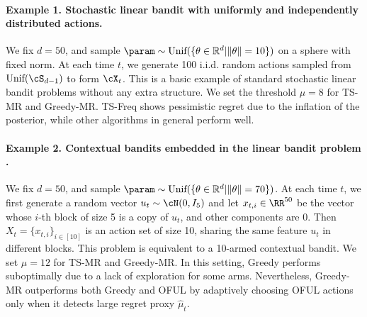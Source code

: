 \paragraph{Example 1. Stochastic linear bandit with uniformly and independently distributed actions.} We fix $d = 50$, and sample $\param\sim\text{Unif}(\{\theta \in \mathbb{R}^d|\|\theta\|= 10\}) $ on a sphere with fixed norm. At each time $t$, we generate 100 i.i.d. random actions sampled from $\text{Unif}(\cS_{d-1})$ to form $\cX_t$. This is a basic example of standard stochastic linear bandit problems without any extra structure. We set the threshold  $\mu = 8$ for TS-MR and Greedy-MR. TS-Freq shows pessimistic regret due to the inflation of the posterior, while other algorithms in general perform well. 



\paragraph{Example 2. Contextual bandits embedded in the linear bandit problem  \citep{abbasi2013online}.} We fix $d = 50$, and sample $\param\sim\text{Unif}(\{\theta \in \mathbb{R}^d|\|\theta\|= 70\}) $. At each time $t$, we first  generate a random vector $u_t \sim \cN(0, I_5)$ and let $x_{t,i}\in \RR^{50}$ be the vector whose $i$-th block of size 5 is a  copy of $u_t$, and other components are 0. Then $X_t = \{x_{t,i}\}_{i\in [10] }$ is an action set of size 10, sharing the same feature $u_t$ in different blocks. This problem is equivalent to a 10-armed contextual bandit. We set $\mu = 12$ for TS-MR and Greedy-MR.  In this setting, Greedy performs suboptimally due to a lack of exploration for some arms. Nevertheless, Greedy-MR outperforms both Greedy and OFUL by adaptively choosing OFUL actions only when it detects large regret proxy $\hat{\mu}_t$.  



